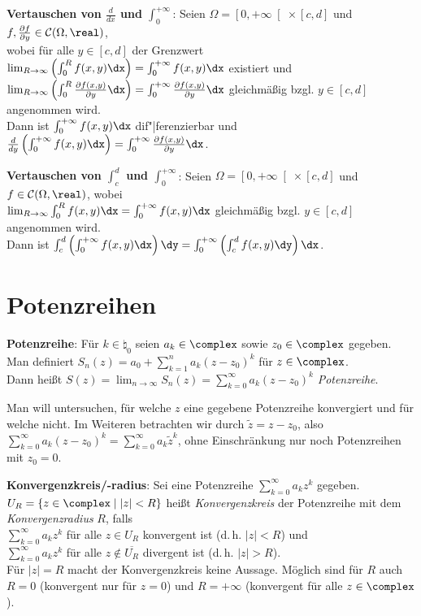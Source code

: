 \linie

\textbf{Vertauschen von $\frac{d}{dx}$ und $\int_0^{+\infty}$}:
Seien $\Omega = \left[0, +\infty\right[ \times [c,d]$ und
$f, \frac{\partial f}{\partial y} \in \C(\Omega, \real)$, \\
wobei für alle $y \in [c,d]$ der Grenzwert
$\lim_{R \to \infty} \left(\int_0^R f(x,y)\dx\right) =
\int_0^{+\infty} f(x,y)\dx$ existiert und \\
$\lim_{R \to \infty}
\left(\int_0^R \frac{\partial f(x, y)}{\partial y}\dx\right) =
\int_0^{+\infty} \frac{\partial f(x,y)}{\partial y}\dx$ gleichmäßig
bzgl. $y \in [c,d]$ angenommen wird. \\
Dann ist $\int_0^{+\infty} f(x,y)\dx$ dif"|ferenzierbar und
$\frac{d}{dy} \left(\int_0^{+\infty} f(x,y)\dx\right) =
\int_0^{+\infty} \frac{\partial f(x,y)}{\partial y}\dx$.

\textbf{Vertauschen von $\int_c^d$ und $\int_0^{+\infty}$}:
Seien $\Omega = \left[0, +\infty\right[ \times [c,d]$ und
$f \in \C(\Omega, \real)$, wobei \\
$\lim_{R \to \infty} \int_0^R f(x,y)\dx = \int_0^{+\infty} f(x,y)\dx$
gleichmäßig bzgl. $y \in [c,d]$ angenommen wird. \\
Dann ist $\int_c^d \left(\int_0^{+\infty} f(x,y)\dx\right)\dy =
\int_0^{+\infty} \left(\int_c^d f(x,y)\dy\right)\dx$.

\section{%
    Potenzreihen%
}

\textbf{Potenzreihe}:
Für $k \in \natural_0$ seien $a_k \in \complex$ sowie $z_0 \in \complex$
gegeben. \\
Man definiert $S_n(z) = a_0 + \sum_{k=1}^n a_k(z - z_0)^k$ für
$z \in \complex$. \\
Dann heißt $S(z) = \lim_{n \to \infty} S_n(z) =
\sum_{k=0}^\infty a_k(z - z_0)^k$ \emph{Potenzreihe}.

Man will untersuchen, für welche $z$ eine gegebene Potenzreihe konvergiert
und für welche nicht.
Im Weiteren betrachten wir durch $\widetilde{z} = z - z_0$, also
$\sum_{k=0}^\infty a_k (z - z_0)^k = \sum_{k=0}^\infty a_k \widetilde{z}^k$,
ohne Einschränkung nur noch Potenzreihen mit $z_0 = 0$.

\textbf{Konvergenzkreis/-radius}:
Sei eine Potenzreihe $\sum_{k=0}^\infty a_k z^k$ gegeben.
$U_R = \{z \in \complex \;|\; |z| < R\}$ heißt \emph{Konvergenzkreis}
der Potenzreihe mit dem \emph{Konvergenzradius} $R$, falls \\
$\sum_{k=0}^\infty a_k z^k$ für alle $z \in U_R$ konvergent ist
(d.\,h. $|z| < R$) und \\
$\sum_{k=0}^\infty a_k z^k$ für alle $z \notin \overline{U_R}$ divergent ist
(d.\,h. $|z| > R$). \\
Für $|z| = R$ macht der Konvergenzkreis keine Aussage.
Möglich sind für $R$ auch $R = 0$ (konvergent nur für $z = 0$)
und $R = +\infty$ (konvergent für alle $z \in \complex$).

